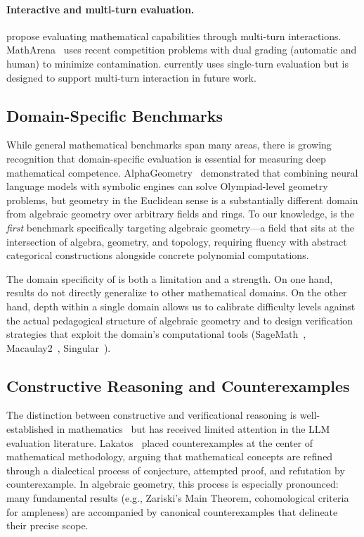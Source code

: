 \paragraph{Interactive and multi-turn evaluation.}
\citet{collins2023evaluating} propose evaluating mathematical capabilities through multi-turn interactions.
MathArena~\citep{matharena2025} uses recent competition problems with dual grading (automatic and human) to minimize contamination.
\ecagbench{} currently uses single-turn evaluation but is designed to support multi-turn interaction in future work.

\subsection{Domain-Specific Benchmarks}

While general mathematical benchmarks span many areas, there is growing recognition that domain-specific evaluation is essential for measuring deep mathematical competence.
AlphaGeometry~\citep{trinh2024alphageometry} demonstrated that combining neural language models with symbolic engines can solve Olympiad-level geometry problems, but geometry in the Euclidean sense is a substantially different domain from algebraic geometry over arbitrary fields and rings.
To our knowledge, \ecagbench{} is the \emph{first} benchmark specifically targeting algebraic geometry---a field that sits at the intersection of algebra, geometry, and topology, requiring fluency with abstract categorical constructions alongside concrete polynomial computations.

The domain specificity of \ecagbench{} is both a limitation and a strength.
On one hand, results do not directly generalize to other mathematical domains.
On the other hand, depth within a single domain allows us to calibrate difficulty levels against the actual pedagogical structure of algebraic geometry and to design verification strategies that exploit the domain's computational tools (SageMath~\citep{sagemath}, Macaulay2~\citep{macaulay2}, Singular~\citep{singular}).

\subsection{Constructive Reasoning and Counterexamples}

The distinction between constructive and verificational reasoning is well-established in mathematics~\citep{hartshorne1977algebraic} but has received limited attention in the LLM evaluation literature.
Lakatos~\citep{lakatos1976proofs} placed counterexamples at the center of mathematical methodology, arguing that mathematical concepts are refined through a dialectical process of conjecture, attempted proof, and refutation by counterexample.
In algebraic geometry, this process is especially pronounced: many fundamental results (e.g., Zariski's Main Theorem, cohomological criteria for ampleness) are accompanied by canonical counterexamples that delineate their precise scope.

